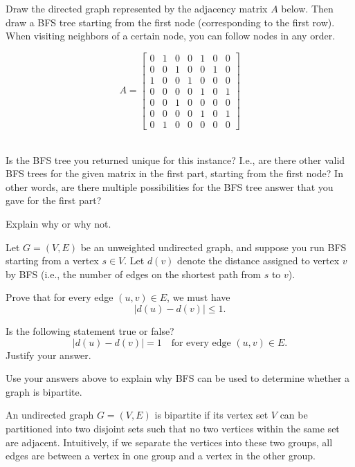\documentclass[11  pt]{article}
\begin{document}
\exercise
\babc
\item
Draw the directed graph represented by the adjacency matrix $A$ below. Then draw a BFS tree starting from the first node (corresponding to the first row). When visiting neighbors of a certain node, you can follow nodes in any order. 

\begin{equation*}
A = \begin{bmatrix}
0 & 1 & 0 & 0 & 1 & 0 & 0 \\
0 & 0 & 1 & 0 & 0 & 1 & 0 \\
1 & 0 & 0 & 1 & 0 & 0 & 0 \\
0 & 0 & 0 & 0 & 1 & 0 & 1 \\
0 & 0 & 1 & 0 & 0 & 0 & 0 \\
0 & 0 & 0 & 0 & 1 & 0 & 1 \\
0 & 1 & 0 & 0 & 0 & 0 & 0
\end{bmatrix}
\end{equation*}\\

\item
Is the BFS tree you returned unique for this instance? 
I.e., are there other valid BFS trees for the given matrix in the first part, starting from the first node? 
In other words, are there multiple possibilities for the BFS tree answer that you gave for the first part?

Explain why or why not.
\eabc

\vspace{0.2in}

\exercise  
Let $G = (V,E)$ be an unweighted undirected graph, and suppose you run BFS starting from a vertex $s \in V$.  
Let $d(v)$ denote the distance assigned to vertex $v$ by BFS (i.e., the number of edges on the shortest path from $s$ to $v$).

\babc
\item  
Prove that for every edge $(u,v) \in E$, we must have
\[|d(u) - d(v)| \le 1.\]

\item  
Is the following statement true or false?
\[|d(u) - d(v)| = 1 \quad \text{for every edge } (u,v) \in E.\]
Justify your answer.

\item  
Use your answers above to explain why BFS can be used to determine whether a graph is bipartite.
\eabc

\newpage

\exercise
An undirected graph $G=(V,E)$ is bipartite if its vertex set $V$ can be partitioned into two disjoint sets such that no two vertices within the same set are adjacent. 
Intuitively, if we separate the vertices into these two groups, all edges are between a vertex in one group and a vertex in the other group.
\end{document}
